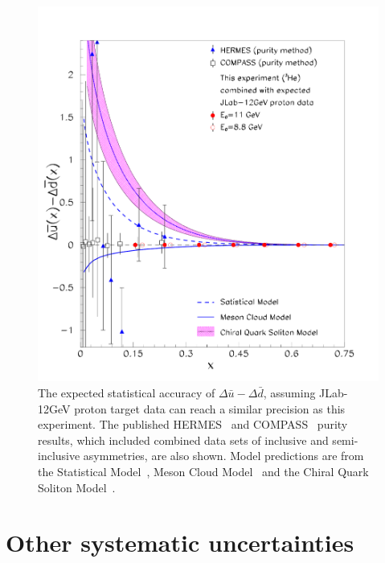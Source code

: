 \begin{figure}[htb]
\centering
   \includegraphics[width=0.8\linewidth]{figs_xj/polubdb_nox_053014.pdf}
\caption{\label{fig:dubdb1} 
The expected statistical accuracy of $\Delta \bar{u} - \Delta \bar{d}$, assuming JLab-12GeV proton target  data can reach a similar precision as this experiment. 
The published HERMES~\cite{Airapetian:2004zf} and COMPASS~\cite{Alekseev:2010ub}  purity 
results, which 
included combined data sets of inclusive and semi-inclusive asymmetries, are also shown.
Model predictions are from the Statistical Model~\protect\cite{Bourrely200739}, Meson Cloud Model~\protect\cite{cao} and 
the Chiral Quark Soliton
Model~\protect\cite{dressler}. 
}
\end{figure}

\section{Other systematic uncertainties}

